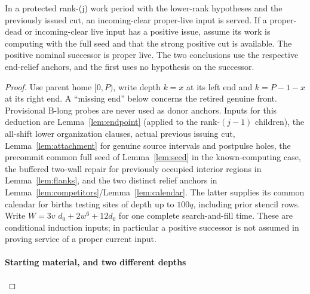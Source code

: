 \begin{lemma}\label{lem:end-ledger}
In a protected rank-(j) work period with the lower-rank hypotheses and the previously issued cut, an incoming-clear proper-live input is served. If a proper-dead or incoming-clear live input has a positive issue, assume its work is computing with the full seed and that the strong positive cut is available. The positive nominal successor is proper live. The two conclusions use the respective end-relief anchors, and the first uses no hypothesis on the successor.
\end{lemma}
\begin{proof}
Use parent home \([0,P)\), write depth \(k=x\) at its left end and \(k=P- 1- x\) at its right end. A ``missing end'' below concerns the retired genuine front. Provisional B-long probes are never used as donor anchors. Inputs for this deduction are Lemma~\ref{lem:endpoint} (applied to the rank-\((j-1)\) children), the all-shift lower organization clauses, actual previous issuing cut, Lemma~\ref{lem:attachment} for genuine source intervals and postpulse holes, the precommit common full seed of Lemma~\ref{lem:seed} in the known-computing case, the buffered two-wall repair for previously occupied interior regions in Lemma~\ref{lem:flanks}, and the two distinct relief anchors in Lemma~\ref{lem:competitors}/Lemma~\ref{lem:calendar}. The latter supplies its common calendar for births testing sites of depth up to \(100q\), including prior stencil rows. Write \(W=3v\) \(d_0+2w^6+12d_0\) for one complete search-and-fill time. These are conditional induction inputs; in particular a positive successor is not assumed in proving service of a proper current input.

\paragraph{Starting material, and two different depths}


\end{proof}

